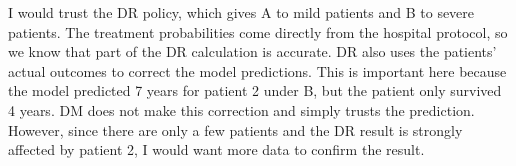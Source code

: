 \documentclass{article}
\begin{document}
I would trust the DR policy, which gives A to mild patients and B to severe patients. The treatment probabilities come directly from the hospital protocol, so we know that part of the DR calculation is accurate. DR also uses the patients' actual outcomes to correct the model predictions. This is important here because the model predicted 7 years for patient 2 under B, but the patient only survived 4 years. DM does not make this correction and simply trusts the prediction. However, since there are only a few patients and the DR result is strongly affected by patient 2, I would want more data to confirm the result.
\end{document}
